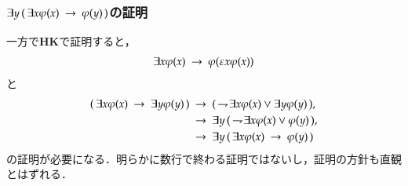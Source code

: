 \documentclass[dvipdfmx,10pt,notheorems]{beamer}
\theoremstyle{definition}
\newcommand{\negation}{\rightharpoondown\hspace{-0.25em}} %
\newcommand{\rarrow}{\hspace{0.25em}\rightarrow\hspace{0.25em}} %
\begin{document}
\begin{frame}\frametitle{$\exists y\, (\, \exists x \varphi(x) \rarrow \varphi(y)\, )$の証明}
	一方で{\bf HK}で証明すると，
	\begin{align}
		\exists x \varphi(x) \rarrow \varphi(\varepsilon x \varphi(x))
	\end{align}
	と
	\begin{align}
		(\, \exists x \varphi(x) \rarrow \exists y \varphi(y) \, )
		&\rarrow (\, \negation \exists x \varphi(x) \vee \exists y \varphi(y) \, ), \\
		&\rarrow \exists y\, (\, \negation \exists x \varphi(x) \vee \varphi(y) \, ), \\
		&\rarrow \exists y\, (\, \exists x \varphi(x) \rarrow \varphi(y) \, )
	\end{align}
	の証明が必要になる．明らかに数行で終わる証明ではないし，証明の方針も直観とはずれる．
\end{frame}


\end{document}
